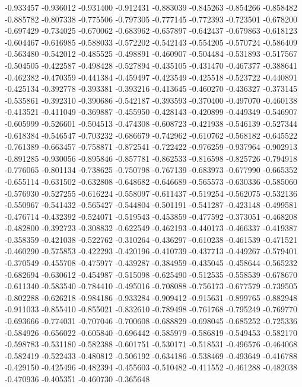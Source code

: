 -0.933457
-0.936012
-0.931400
-0.912431
-0.883039
-0.845263
-0.854266
-0.858482
-0.885782
-0.807338
-0.775506
-0.797305
-0.777145
-0.772393
-0.723501
-0.678200
-0.697429
-0.734025
-0.670062
-0.683962
-0.657897
-0.642437
-0.679863
-0.618123
-0.604467
-0.616985
-0.588033
-0.572202
-0.542143
-0.554205
-0.570724
-0.586409
-0.563480
-0.542012
-0.485525
-0.498891
-0.460907
-0.504484
-0.531893
-0.517567
-0.504505
-0.422587
-0.498428
-0.527894
-0.435105
-0.431470
-0.467377
-0.388641
-0.462382
-0.470359
-0.441384
-0.459497
-0.423549
-0.425518
-0.523722
-0.440891
-0.425134
-0.392778
-0.393381
-0.393216
-0.413645
-0.460270
-0.436327
-0.373145
-0.535861
-0.392310
-0.390686
-0.542187
-0.393593
-0.370400
-0.497070
-0.460138
-0.413521
-0.411049
-0.369887
-0.455950
-0.428143
-0.420899
-0.449349
-0.546907
-0.605999
-0.526601
-0.504513
-0.474308
-0.608723
-0.421938
-0.546139
-0.527344
-0.618384
-0.546547
-0.703232
-0.686679
-0.742962
-0.610762
-0.568182
-0.645522
-0.761389
-0.663457
-0.758871
-0.872541
-0.722422
-0.976259
-0.937964
-0.902913
-0.891285
-0.930056
-0.895846
-0.857781
-0.862533
-0.816598
-0.825726
-0.794918
-0.776065
-0.801134
-0.738625
-0.750798
-0.767139
-0.683973
-0.677990
-0.665352
-0.655114
-0.631502
-0.632808
-0.648682
-0.646689
-0.565573
-0.630336
-0.585060
-0.576930
-0.527255
-0.616224
-0.558097
-0.611437
-0.519254
-0.562075
-0.532136
-0.550967
-0.541432
-0.565427
-0.544804
-0.501191
-0.541287
-0.423148
-0.499581
-0.476714
-0.432392
-0.524071
-0.519543
-0.453859
-0.477592
-0.373051
-0.468208
-0.482800
-0.392723
-0.308832
-0.622549
-0.462193
-0.440173
-0.466337
-0.419387
-0.358359
-0.421038
-0.522762
-0.310264
-0.436297
-0.610238
-0.461539
-0.471521
-0.460290
-0.575853
-0.422293
-0.420196
-0.410739
-0.437713
-0.449267
-0.579401
-0.370549
-0.455708
-0.475977
-0.439287
-0.384959
-0.435045
-0.458644
-0.565232
-0.682694
-0.630612
-0.454987
-0.515098
-0.625490
-0.512535
-0.558539
-0.678670
-0.611340
-0.583540
-0.784410
-0.495016
-0.708088
-0.756173
-0.677579
-0.739505
-0.802288
-0.626218
-0.984186
-0.933284
-0.909412
-0.915631
-0.899765
-0.882948
-0.911033
-0.855410
-0.855021
-0.832610
-0.789498
-0.761768
-0.795249
-0.769770
-0.693666
-0.774031
-0.707046
-0.700608
-0.688829
-0.698045
-0.685252
-0.725336
-0.584926
-0.656022
-0.605840
-0.696442
-0.585979
-0.586819
-0.549453
-0.582170
-0.598783
-0.531180
-0.582388
-0.601751
-0.530171
-0.518531
-0.496576
-0.464068
-0.582419
-0.522433
-0.480812
-0.506192
-0.634186
-0.538469
-0.493649
-0.416788
-0.429150
-0.425496
-0.482394
-0.455603
-0.510482
-0.411552
-0.461288
-0.482038
-0.470936
-0.405351
-0.460730
-0.365648
